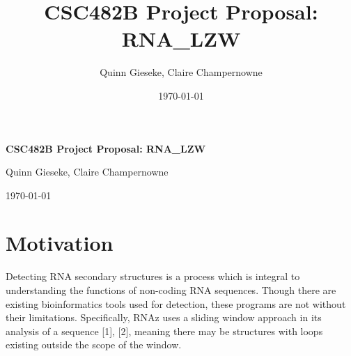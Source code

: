\documentclass[letterpaper, 12pt]{artikel3}
\title{CSC482B Project Proposal: RNA\_LZW}
\date{\today}
\author{Quinn Gieseke, Claire Champernowne}
\begin{document}

\Huge\textbf{CSC482B Project Proposal: RNA\_LZW}

\large{Quinn Gieseke, Claire Champernowne}

\large{\today}
\normalsize









\vspace{-7mm}
\section*{Motivation}
Detecting RNA secondary structures is a process which is integral to understanding the functions of non-coding RNA sequences. Though there are existing bioinformatics tools used for detection, these programs are not without their limitations.  Specifically,  RNAz uses a sliding window approach in its analysis of a sequence [1], [2], meaning there may be structures with loops existing outside the scope of the window. 
\end{document}
